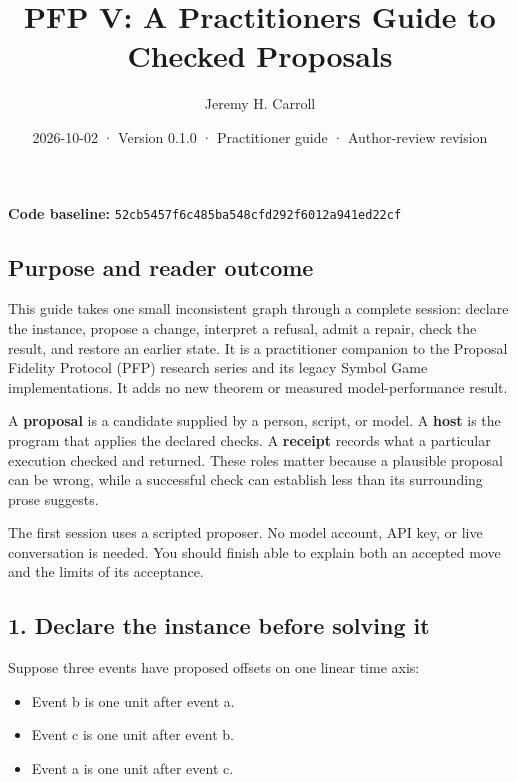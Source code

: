 \documentclass[
  11pt,
]{article}
\title{PFP V: A Practitioner\textquotesingle s Guide to Checked
Proposals}
\author{Jeremy H. Carroll}
\date{2026-10-02 · Version 0.1.0 · Practitioner guide · Author-review
revision}
\providecommand{\tightlist}{%
  \setlength{\itemsep}{0pt}\setlength{\parskip}{0pt}}
\begin{document}
\makeatletter
\begin{center}
{\LARGE \@title\par}
\vspace{0.8em}
{\normalsize \@author\par}
\vspace{0.5em}
{\small \@date\par}
\end{center}
\makeatother

\textbf{Code baseline:}
\nolinkurl{52cb5457f6c485ba548cfd292f6012a941ed22cf}

\subsection{Purpose and reader
outcome}\label{purpose-and-reader-outcome}

This guide takes one small inconsistent graph through a complete
session: declare the instance, propose a change, interpret a refusal,
admit a repair, check the result, and restore an earlier state. It is a
practitioner companion to the Proposal Fidelity Protocol (PFP) research
series and its legacy Symbol Game implementations. It adds no new
theorem or measured model-performance result.

A \textbf{proposal} is a candidate supplied by a person, script, or
model. A \textbf{host} is the program that applies the declared checks.
A \textbf{receipt} records what a particular execution checked and
returned. These roles matter because a plausible proposal can be wrong,
while a successful check can establish less than its surrounding prose
suggests.

The first session uses a scripted proposer. No model account, API key,
or live conversation is needed. You should finish able to explain both
an accepted move and the limits of its acceptance.

\subsection{1. Declare the instance before solving
it}\label{declare-the-instance-before-solving-it}

Suppose three events have proposed offsets on one linear time axis:

\begin{itemize}
\tightlist
\item
  Event b is one unit after event a.
\item
  Event c is one unit after event b.
\item
  Event a is one unit after event c.
\end{itemize}
\end{document}
